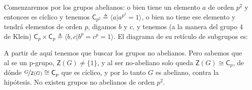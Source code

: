 \documentclass[12pt,a4paper,fleqn,spanish,final,openright]{extbook}
\theoremstyle{definition}
\theoremstyle{remark}
\begin{document}
Comenzaremos por los grupos abelianos: o bien tiene un elemento $a$ de orden $p^2$ y entonces es cíclico y tenemos $\mathsf{C}_{p^2}\triangleq\langle{a\vert a^{p^2}=1}\rangle$, o bien no tiene ese elemento y tendrá elementos de orden $p$, digamos $b$ y $c$, y tenemos (a la manera del grupo 4 de Klein) $\mathsf{C}_{p}   \times   \mathsf{C}_{p}\triangleq\langle{b,c\vert b^{p}=c^{p}=1}\rangle$. El diagrama de su retículo de subgrupos es:






\begin{center}
\end{center}


A partir de aquí tenemos que buscar los grupos no abelianos. Pero sabemos que al se un p-grupo, $\mathsf{Z}\left(G\right)   \neq   \{1\}$, y al ser no-abeliano solo queda $\mathsf{Z}\left(G\right)   \cong   \mathsf{C}_{p}$,
de dónde $\nicefrac{G}{\mathsf{Z}\left(G\right)}    \cong    \mathsf{C}_{p}$ que es cíclico, y por lo tanto $G$ es abeliano, contra la hipótesis. No existen grupos no abelianos de orden $p^2$.
\end{document}
